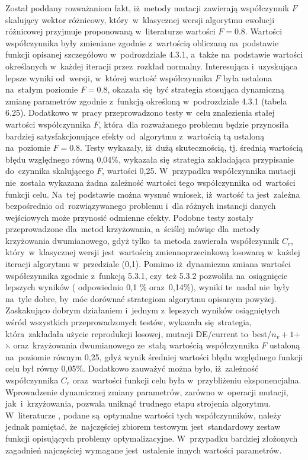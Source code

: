 Został poddany rozważaniom fakt, iż~metody mutacji zawierają współczynnik $F$ skalujący wektor różnicowy, który~w~klasycznej wersji algorytmu ewolucji różnicowej przyjmuje proponowaną w~literaturze wartości $F = 0.8$. Wartości współczynnika były zmieniane zgodnie z~wartością obliczaną na~podstawie funkcji opisanej szczegółowo w~podrozdziale 4.3.1, a~także na~podstawie wartości określanych w~każdej iteracji przez~rozkład normalny. Interesująca i~uzyskująca lepsze wyniki od~wersji, w~której wartość współczynnika $F$ była ustalona na~stałym poziomie $F=0.8$, okazała się~być strategia stosująca dynamiczną zmianę parametrów zgodnie z~funkcją określoną w~podrozdziale 4.3.1 (tabela 6.25). Dodatkowo w~pracy przeprowadzono testy w~celu znalezienia stałej wartości współczynnika $F$, która~dla rozważanego problemu będzie przynosiła bardziej satysfakcjonujące efekty od~algorytmu z~wartością tą ustaloną na~poziomie $F=0.8$. Testy wykazały, iż~dużą skutecznością, tj. średnią wartością błędu względnego równą 0,04\%, wykazała się~strategia zakładająca przypisanie do~czynnika skalującego $F$, wartości 0,25. W~przypadku współczynnika mutacji nie~została wykazana żadna zależność wartości tego współczynnika od~wartości funkcji celu. Na~tej podstawie można wysnuć wniosek, iż~wartość ta jest~zależna bezpośrednio od~rozwiązywanego problemu i~dla różnych instancji danych wejściowych może przynosić odmienne efekty. 
Podobne testy zostały przeprowadzone dla~metod krzyżowania, a~ściślej mówiąc dla~metody krzyżowania dwumianowego, gdyż tylko~ta metoda zawierała współczynnik $C_{r}$, który~w~klasycznej wersji jest~wartością zmiennoprzecinkową losowaną w~każdej iteracji algorytmu w~przedziale (0,1). Pomimo iż~dynamiczna zmiana wartości współczynnika zgodnie z~funkcją 5.3.1, czy~też 5.3.2 pozwoliła na~osiągnięcie lepszych wyników ( odpowiednio 0,1 \% oraz~0,14\%), wyniki te~nadal nie~były na~tyle dobre, by~móc dorównać strategiom algorytmu opisanym powyżej. Zaskakująco dobrym działaniem i~jednym z~lepszych wyników osiągniętych wśród wszystkich przeprowadzonych testów, wykazała się~strategia, która~zakładała użycie reprodukcji losowej, mutacji DE/current to~best/$n_{v}+1$+$\leftthreetimes$ oraz~krzyżowania dwumianowego ze~stałą wartością współczynnika $F$ ustaloną na~poziomie równym 0,25, gdyż wynik średniej wartości błędu względnego funkcji celu był równy 0,05\%. Dodatkowo zauważyć można było, iż~zależność współczynnika $C_{r}$ oraz~wartości funkcji celu była w~przybliżeniu eksponencjalna.
Wprowadzenie dynamicznej zmiany parametrów, zarówno w~operacji mutacji, jak~i~krzyżowania, pozwala uniknąć trudnego etapu strojenia algorytmu. W~literaturze \cite{doktorat}, \cite{diff2} podane są~optymalne wartości tych współczynników, należy jednak pamiętać, że~najczęściej zbiorem testowym jest~standardowy zestaw funkcji opisujących problemy optymalizacyjne. W~przypadku bardziej złożonych zagadnień najczęściej wymagane jest~ustalenie innych wartości parametrów.\\

